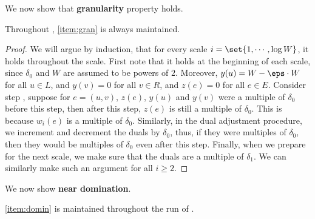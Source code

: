 We now show that \textbf{granularity} property holds. 
\begin{claim2}\label{claim:domination}
Throughout , \ref{item:gran} is always maintained. 
\end{claim2}
\begin{proof}
We will argue by induction, that for every scale $i=\set{1,\cdots, \log W}$, it holds throughout the scale. First note that it holds at the beginning of each scale, since $\delta_0$ and $W$ are assumed to be powers of $2$. Moreover, $y(u)=W-\eps\cdot W$ for all $u\in L$, and $y(v)=0$ for all $v\in R$, and $z(e)=0$ for all $e\in E$. Consider step , suppose for $e=(u,v)$, $z(e)$, $y(u)$ and $y(v)$ were a multiple of $\delta_0$ before this step, then after this step, $z(e)$ is still a multiple of $\delta_0$. This is because $w_i(e)$ is a multiple of $\delta_0$. Similarly, in the dual adjustment procedure, we increment and decrement the duals by $\delta_0$, thus, if they were multiples of $\delta_0$, then they would be multiples of $\delta_0$ even after this step. Finally, when we prepare for the next scale, we make sure that the duals are a multiple of $\delta_1$. We can similarly make such an argument for all $i\geqslant 2$. 
\end{proof}
We now show \textbf{near domination}. 
\begin{claim2}
\ref{item:domin} is maintained throughout the run of .
\end{claim2}

